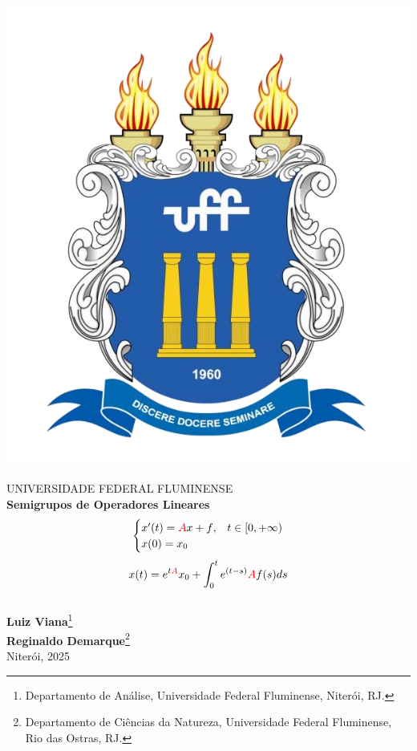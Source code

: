 \documentclass[12pt]{book}
\theoremstyle{definition}
\theoremstyle{remark}
\numberwithin{section}{chapter}
\numberwithin{equation}{chapter}
\begin{document}
\begin{titlepage}
\begin{center}
\includegraphics[scale=0.15]{brasao-cor.png}~\\
UNIVERSIDADE FEDERAL FLUMINENSE \\[4cm]
{\Huge \textbf{Semigrupos de Operadores Lineares}}\\
{\Large
\begin{equation*}
\begin{cases}
x'(t)={\color{red}A}x+{\color{black}f},& t\in [0,+\infty)\\
x(0)=x_0
\end{cases}
\end{equation*}
\begin{equation*}
x(t)=e^{t\color{red}A}x_0+\int_0^t e^{(t-s)}{\color{red}A}f(s)ds
\end{equation*}}\\[1cm]
\textbf{Luiz Viana}\footnote{Departamento de Análise, Universidade Federal Fluminense, Niterói, RJ.}\\
\textbf{Reginaldo Demarque}\footnote{Departamento de Ciências da Natureza, Universidade Federal Fluminense, Rio das Ostras, RJ.}\\
\vfill
{\large Niterói, 2025}
\end{center}
\end{titlepage}
\end{document}
